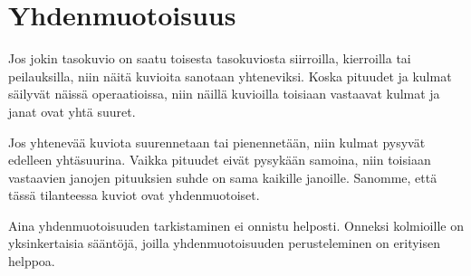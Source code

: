 \section*{Yhdenmuotoisuus}

Jos jokin tasokuvio on saatu toisesta tasokuviosta siirroilla, kierroilla tai
peilauksilla, niin näitä kuvioita sanotaan yhteneviksi. Koska pituudet ja kulmat säilyvät
näissä operaatioissa, niin näillä kuvioilla toisiaan vastaavat kulmat ja janat
ovat yhtä suuret.

Jos yhtenevää kuviota suurennetaan tai pienennetään, niin kulmat pysyvät edelleen yhtäsuurina.
Vaikka pituudet eivät pysykään samoina, niin toisiaan vastaavien janojen pituuksien suhde
on sama kaikille janoille. Sanomme, että tässä tilanteessa kuviot ovat yhdenmuotoiset.


Aina yhdenmuotoisuuden tarkistaminen ei onnistu helposti. Onneksi kolmioille on yksinkertaisia
sääntöjä, joilla yhdenmuotoisuuden perusteleminen on erityisen helppoa.


